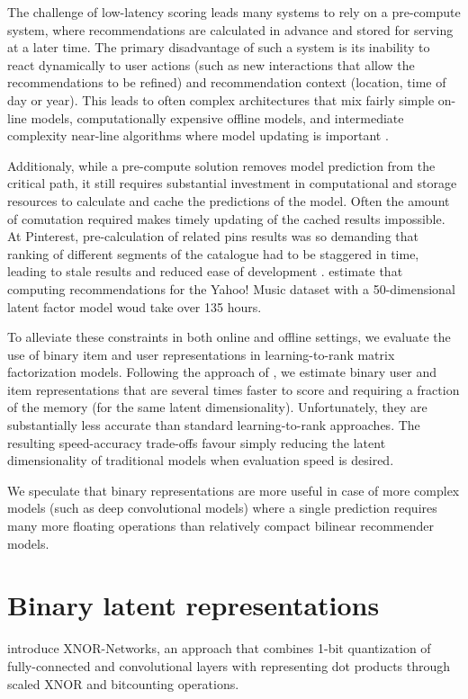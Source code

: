 \documentclass[sigchi]{acmart}
\begin{document}
The challenge of low-latency scoring leads many systems to rely on a pre-compute system, where recommendations are calculated in advance and stored for serving at a later time. The primary disadvantage of such a system is its inability to react dynamically to user actions (such as new interactions that allow the recommendations to be refined) and recommendation context (location, time of day or year). This leads to often complex architectures that mix fairly simple on-line models, computationally expensive offline models, and intermediate complexity near-line algorithms where model updating is important \citep{amatriain2013big}.

Additionaly, while a pre-compute solution removes model prediction from the critical path, it still requires substantial investment in computational and storage resources to calculate and cache the predictions of the model. Often the amount of comutation required makes timely updating of the cached results impossible. At Pinterest, pre-calculation of related pins results was so demanding that ranking of different segments of the catalogue had to be staggered in time, leading to stale results and reduced ease of development \citep[Section 5.5]{liu2017related}. \citet{koenigstein2012efficient} estimate that computing recommendations for the Yahoo! Music dataset \citep{dror2011yahoo} with a 50-dimensional latent factor model woud take over 135 hours.

To alleviate these constraints in both online and offline settings, we evaluate the use of binary item and user representations in learning-to-rank matrix factorization models. Following the approach of \citet{rastegari2016xnor}, we estimate binary user and item representations that are several times faster to score and requiring a fraction of the memory (for the same latent dimensionality). Unfortunately, they are substantially less accurate than standard learning-to-rank approaches. The resulting speed-accuracy trade-offs favour simply reducing the latent dimensionality of traditional models when evaluation speed is desired.

We speculate that binary representations are more useful in case of more complex models (such as deep convolutional models) where a single prediction requires many more floating operations than relatively compact bilinear recommender models.


\section{Binary latent representations}
\label{sec:approach}
\citet{rastegari2016xnor} introduce XNOR-Networks, an approach that combines 1-bit quantization of fully-connected and convolutional layers with representing dot products through scaled XNOR and bitcounting operations.
\end{document}
